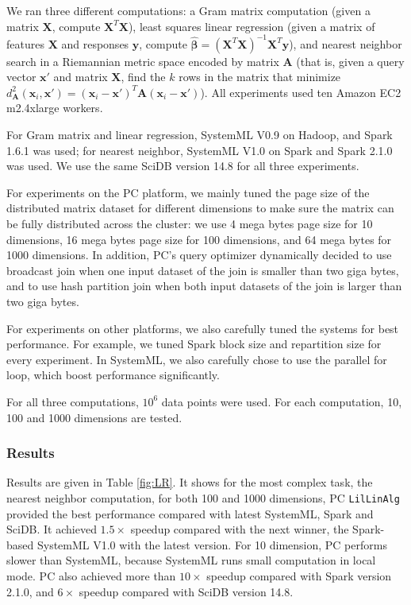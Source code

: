 We ran three different computations:
a Gram matrix computation (given a matrix $\textbf{X}$, compute
$\textbf{X}^T \textbf{X}$), least squares linear regression (given a matrix of features $\textbf{X}$ and
responses $\textbf{y}$, compute 
$\hat{\pmb{\beta}} = (\textbf{X}^{T} \textbf{X})^{-1} \textbf{X}^{T} \textbf{y}$), and nearest
neighbor search in a Riemannian metric space \cite{lebanon2006metric} encoded by matrix $\textbf{A}$ (that is,
given a query vector
$\textbf{x}'$ and matrix $\textbf{X}$, find the $k$ rows in the matrix that minimize 
$d_{\textbf{A}}^2(\textbf{x}_i, \textbf{x}') = 
(\textbf{x}_i - \textbf{x}')^T\textbf{A}(\textbf{x}_i - \textbf{x}')$).  All experiments used
ten Amazon
EC2 m2.4xlarge workers.  

For Gram matrix and linear regression, SystemML V0.9 on Hadoop,
and Spark 1.6.1 was used; for
nearest neighbor, SystemML V1.0 on Spark and Spark 2.1.0 was used. We
use the same SciDB version 14.8 for all three
experiments.

For experiments on the PC platform, we mainly tuned the page size of the
distributed matrix dataset for different dimensions to make sure the
matrix can be fully distributed across the cluster:
we use 4 mega bytes page size for 10 dimensions, 16 mega bytes page
size for 100 dimensions, and 64 mega bytes for 1000 dimensions. In addition, PC's query optimizer dynamically decided to use
broadcast join when one input dataset of the join is smaller than two
giga bytes, and to use hash partition join when both input datasets of
the join is larger than two giga bytes.

For experiments on other platforms, we also carefully tuned the
systems for best performance. For example, we tuned Spark block size and repartition
size for every experiment. In SystemML, we also carefully chose to
use the parallel for loop, which boost performance significantly.

For
all three computations, 
$10^6$ data points were used. For each computation, 10, 100 and 1000
dimensions are tested.


\subsubsection {Results}

Results are given in 
Table \ref{fig:LR}. It shows for the most complex task, the nearest
neighbor computation, for both 100 and 1000 dimensions, PC
\texttt{LilLinAlg} provided the best performance compared with latest
SystemML, Spark and SciDB. It achieved $1.5\times$ speedup compared with
the next winner, the Spark-based
SystemML V1.0 with the latest version. For 10 dimension, PC performs slower
than SystemML, because SystemML runs small computation in local
mode. PC also achieved more than $10\times$ speedup compared with
Spark version 2.1.0, and $6\times$ speedup compared with SciDB version
14.8. 

